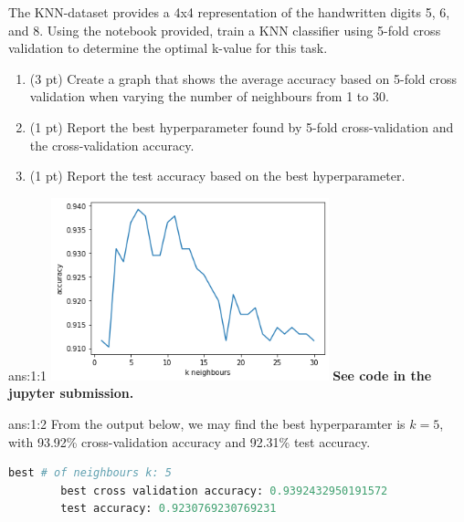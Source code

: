 \documentclass{tron}
\newcommand{\mref}[1]{\underline{\textbf{\hypersetup{linkcolor=orange}\Cref{#1}\hypersetup{linkcolor=blue}}}}
\begin{document}
\setcounter{section}{1}
\begin{exercise}{}
The KNN-dataset provides a 4x4 representation of the handwritten digits 5, 6, and 8. Using the notebook provided, train a KNN classifier using 5-fold cross validation to determine the optimal k-value for this task.

\begin{enumerate}
\item (3 pt) Create a graph that shows the average accuracy based on 5-fold cross validation when varying the number of neighbours from 1 to 30.

\ans{\mref{ans:1:1}}

\item (1 pt) Report the best hyperparameter found by 5-fold cross-validation and the cross-validation accuracy.

\ans{\mref{ans:1:2}} 

\item (1 pt) Report the test accuracy based on the best hyperparameter.

\ans{\mref{ans:1:3}} 
\end{enumerate}
\end{exercise}


\begin{answer}{ans:1:1}
	{	
			\centering
			\includegraphics[height=200px]{Fig/q1}
	}	
	\textbf{See code in the jupyter submission.}
\end{answer}

\begin{answer}{ans:1:2}
	From the output below, we may find the best hyperparamter is $k=5$, with 93.92\% cross-validation accuracy and 92.31\% test accuracy.
	
	\begin{lstlisting}[language=python, style=mystyle:output]
		best # of neighbours k: 5
		best cross validation accuracy: 0.9392432950191572
		test accuracy: 0.9230769230769231
	\end{lstlisting}
	\vspace{-20pt}
\end{answer}
\end{document}

